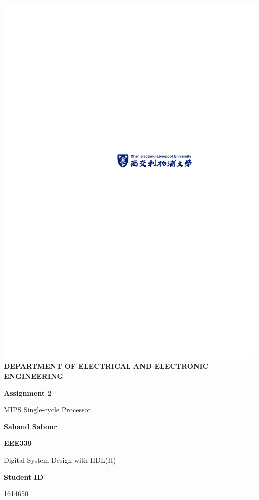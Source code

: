 \documentclass[12pt,a4paper]{article}
\begin{document}
	\begin{titlepage}
		\begin{center}
			\includegraphics[scale=1.5]{figures/CoverSheet}\\
			\bf{ \small{DEPARTMENT OF ELECTRICAL AND ELECTRONIC ENGINEERING} }
		\end{center}
		
		\vspace{4cm}
		\centering
		\textbf{\Huge Assignment 2}
		
		\vspace{1cm}
		
		{\Large MIPS Single-cycle Processor}
		
		\vspace{4cm}
		
		\textbf{\LARGE Sahand Sabour}
		
		\vspace{2cm}
		
		\textbf{\large EEE339}
		
		\vspace{0.5cm}
		
		{\large Digital System Design with HDL(II)}
		
		\vspace{1.5cm}
		
		\textbf{\large Student ID}
		
		\vspace{0.5cm}
		
		{\large 1614650}
		
		\vfill
		
	\end{titlepage}
\end{document}
